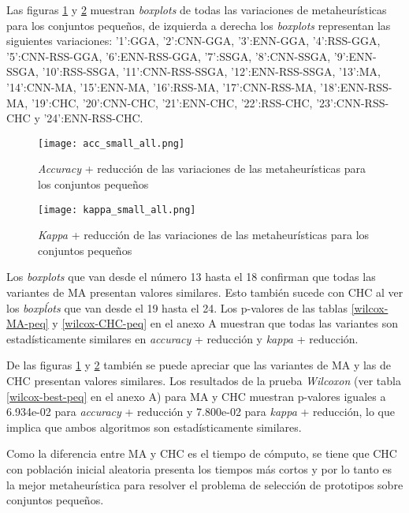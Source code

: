 Las figuras \ref{small-accu-all} y \ref{small-kap-all} muestran \emph{boxplots} de todas las variaciones de metaheurísticas para los conjuntos pequeños, de izquierda a derecha los \emph{boxplots} representan las siguientes variaciones: '1':GGA, '2':CNN-GGA, '3':ENN-GGA, '4':RSS-GGA, '5':CNN-RSS-GGA, '6':ENN-RSS-GGA, '7':SSGA, '8':CNN-SSGA, '9':ENN-SSGA, '10':RSS-SSGA, '11':CNN-RSS-SSGA, '12':ENN-RSS-SSGA, '13':MA, '14':CNN-MA, '15':ENN-MA, '16':RSS-MA, '17':CNN-RSS-MA, '18':ENN-RSS-MA, '19':CHC, '20':CNN-CHC, '21':ENN-CHC, '22':RSS-CHC, '23':CNN-RSS-CHC y '24':ENN-RSS-CHC.

\begin{figure}[h!]

	\centering
	\texttt{[image: acc\_small\_all.png]}

\caption{\emph{Accuracy} + reducción de las variaciones de las metaheurísticas para los conjuntos pequeños}
\label{small-accu-all}
\end{figure}


\begin{figure}[h!]

	\centering
	\texttt{[image: kappa\_small\_all.png]}

\caption{\emph{Kappa} + reducción de las variaciones de las metaheurísticas para los conjuntos pequeños}
\label{small-kap-all}
\end{figure}

Los \emph{boxplots} que van desde el número 13 hasta el 18 confirman que todas las variantes de MA presentan valores similares. Esto también sucede con CHC al ver los \emph{boxpĺots} que van desde el 19 hasta el 24. Los p-valores de las tablas \ref{wilcox-MA-peq} y \ref{wilcox-CHC-peq} en el anexo A muestran que todas las variantes son estadísticamente similares en \emph{accuracy} + reducción y \emph{kappa} + reducción.

De las figuras \ref{small-accu-all} y \ref{small-kap-all} también se puede apreciar que las variantes de MA y las de CHC presentan valores similares. Los resultados de la prueba \emph{Wilcoxon} (ver tabla \ref{wilcox-best-peq} en el anexo A) para MA y CHC muestran p-valores iguales a 6.934e-02 para \emph{accuracy} + reducción y 7.800e-02 para \emph{kappa} + reducción, lo que implica que ambos algoritmos son estadísticamente similares.

Como la diferencia entre MA y CHC es el tiempo de cómputo, se tiene que CHC con población inicial aleatoria presenta los tiempos más cortos y por lo tanto es la mejor metaheurística para resolver el problema de selección de prototipos sobre conjuntos pequeños.


